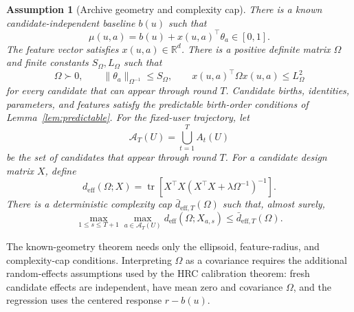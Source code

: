 \documentclass{article} %
\newtheorem{assumption}{Assumption}
\begin{document}
\begin{assumption}[Archive geometry and complexity cap]
\label{assump:shared-structure}
There is a known candidate-independent baseline $b(u)$ such that
\begin{equation}
\label{eq:hyper-linear-model}
\mu(u,a)
=
b(u)+x(u,a)^{\top}\theta_a
\in[0,1].
\end{equation}
The feature vector satisfies $x(u,a)\in\mathbb{R}^d$. There is a positive
definite matrix $\Omega$ and finite constants $S_\Omega,L_\Omega$ such that
\begin{equation}
\label{eq:hyper-pd}
\Omega\succ0,\qquad
\|\theta_a\|_{\Omega^{-1}}\le S_\Omega,\qquad
x(u,a)^\top\Omega x(u,a)\le L_\Omega^2
\end{equation}
for every candidate that can appear through round $T$. Candidate births,
identities, parameters, and features satisfy the predictable birth-order
conditions of Lemma~\ref{lem:predictable}. For the fixed-user trajectory, let
\begin{equation}
\label{eq:hyper-realized-union-main}
\mathcal A_T(U)
=
\bigcup_{t=1}^{T}A_t(U)
\end{equation}
be the set of candidates that appear through round $T$. For a candidate design matrix $X$,
define
\begin{equation}
\label{eq:hyper-deff}
d_{\mathrm{eff}}(\Omega;X)
=
\operatorname{tr}
\!\left[
X^{\top}X
\left(
X^{\top}X+\lambda\Omega^{-1}
\right)^{-1}
\right].
\end{equation}
There is a deterministic complexity cap $\bar d_{\mathrm{eff},T}(\Omega)$ such
that, almost surely,
\begin{equation}
\label{eq:hyper-low-deff}
\max_{1\le s\le T+1}\max_{a\in\mathcal A_T(U)}
d_{\mathrm{eff}}(\Omega;X_{a,s})
\le
\bar d_{\mathrm{eff},T}(\Omega).
\end{equation}
\end{assumption}

The known-geometry theorem needs only the ellipsoid, feature-radius, and
complexity-cap conditions. Interpreting $\Omega$ as a covariance requires the
additional random-effects assumptions used by the HRC calibration theorem:
fresh candidate effects are independent, have mean zero and covariance
$\Omega$, and the regression uses the centered response $r-b(u)$.
\end{document}
